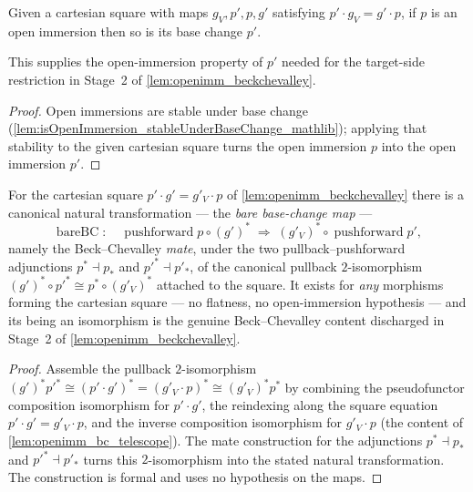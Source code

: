 \begin{lemma}
  \label{lem:isOpenImmersion_of_isPullback_left}
  Given a cartesian square with maps \(g_V, p', p, g'\) satisfying \(p' \cdot g_V = g'
  \cdot p\), if \(p\) is an open immersion then so is its base change \(p'\).

  This supplies the open-immersion property of \(p'\) needed for the target-side restriction in
  Stage~2 of \cref{lem:openimm_beckchevalley}.
\end{lemma}
\begin{proof}
  Open immersions are stable under base change
  (\cref{lem:isOpenImmersion_stableUnderBaseChange_mathlib}); applying that stability to the given
  cartesian square turns the open immersion \(p\) into the open immersion \(p'\).
\end{proof}

\begin{lemma}
  \label{lem:openimm_bareBC}
  For the cartesian square \(p' \cdot g' = g'_V \cdot p\) of \cref{lem:openimm_beckchevalley} there
  is a canonical natural transformation --- the \emph{bare base-change map} ---
  \[
    \operatorname{bareBC} \colon\quad
    \operatorname{pushforward} p \circ (g')^*
      \;\Longrightarrow\;
    (g'_V)^* \circ \operatorname{pushforward} p',
  \]
  namely the Beck--Chevalley \emph{mate}, under the two pullback--pushforward adjunctions
  \(p^* \dashv p_*\) and \(p'^* \dashv p'_*\), of the canonical pullback \(2\)-isomorphism
  \((g')^* \circ p'^* \cong p^* \circ (g'_V)^*\) attached to the square. It exists for \emph{any}
  morphisms forming the cartesian square --- no flatness, no open-immersion hypothesis --- and its
  being an isomorphism is the genuine Beck--Chevalley content discharged in Stage~2 of
  \cref{lem:openimm_beckchevalley}.
\end{lemma}
\begin{proof}
  Assemble the pullback \(2\)-isomorphism
  \((g')^* p'^* \cong (p' \cdot g')^* = (g'_V \cdot p)^* \cong (g'_V)^* p^*\) by combining
  the pseudofunctor composition isomorphism for \(p' \cdot g'\), the reindexing along the square
  equation \(p' \cdot g' = g'_V \cdot p\), and the inverse composition isomorphism for
  \(g'_V \cdot p\) (the content of \cref{lem:openimm_bc_telescope}). The mate construction for the adjunctions \(p^* \dashv p_*\) and
  \(p'^* \dashv p'_*\) turns this \(2\)-isomorphism into the stated natural transformation. The
  construction is formal and uses no hypothesis on the maps.
\end{proof}

